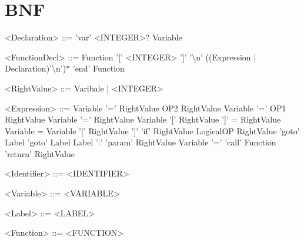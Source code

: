 \documentclass{ctexart}
\newenvironment{typewriterfont}{\ttfamily}{\par}
\begin{document}
\section{BNF}
\begin{typewriterfont}
\setlength{\grammarindent}{8em} %
\begin{grammar}
<Declaration> ::= 'var' <INTEGER>? Variable

<FunctionDecl> ::= Function '[' <INTEGER> ']' '\textbackslash n' ((Expression | Declaration)'\textbackslash n')* 'end' Function

<RightValue> ::= Varibale | <INTEGER>

<Expression>	::=	Variable '=' RightValue OP2 RightValue
\alt Variable '=' OP1 RightValue
\alt Variable '=' RightValue
\alt Variable '[' RightValue ']' = RightValue
\alt Variable = Variable '[' RightValue ']'
\alt 'if' RightValue LogicalOP RightValue 'goto' Label
\alt 'goto' Label
\alt Label ':'
\alt 'param' RightValue
\alt Variable '=' 'call' Function
\alt 'return' RightValue


<Identifier>	::=	<IDENTIFIER>

<Variable> ::= <VARIABLE>

<Label> ::= <LABEL>

<Function> ::= <FUNCTION>

\end{grammar}
\end{typewriterfont}
\newpage
\end{document}
